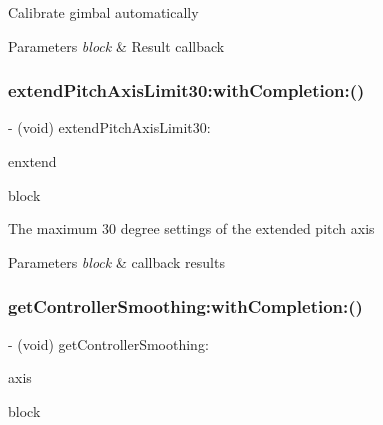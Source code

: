 Calibrate gimbal automatically


\begin{DoxyParams}{Parameters}
{\em block} & Result callback \\
\hline
\end{DoxyParams}
\mbox{\label{interface_p_v_gimabal_af0948378a45db8868439fd3457246dd2}} 
\subsubsection{\texorpdfstring{extend\+Pitch\+Axis\+Limit30\+:with\+Completion\+:()}{extendPitchAxisLimit30:withCompletion:()}}
{\footnotesize\ttfamily -\/ (void) extend\+Pitch\+Axis\+Limit30\+: \begin{DoxyParamCaption}\item[{(B\+O\+OL)}]{enxtend }\item[{withCompletion:(P\+V\+Completion\+Block)}]{block }\end{DoxyParamCaption}}

The maximum 30 degree settings of the extended pitch axis


\begin{DoxyParams}{Parameters}
{\em block} & callback results \\
\hline
\end{DoxyParams}
\mbox{\label{interface_p_v_gimabal_ab18eed4f5255289a86d46777a37f95f1}} 
\subsubsection{\texorpdfstring{get\+Controller\+Smoothing\+:with\+Completion\+:()}{getControllerSmoothing:withCompletion:()}}
{\footnotesize\ttfamily -\/ (void) get\+Controller\+Smoothing\+: \begin{DoxyParamCaption}\item[{(P\+V\+Gimbal\+Axis)}]{axis }\item[{withCompletion:(void($^\wedge$)(N\+S\+Integer smoothing, N\+S\+Error $\ast$\+\_\+\+Nullable error))}]{block }\end{DoxyParamCaption}}

